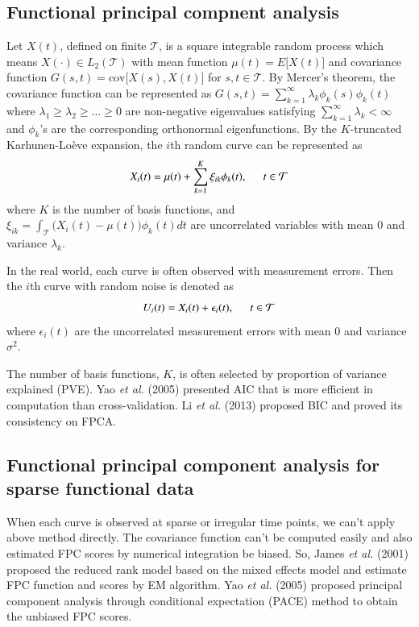 \documentclass[eng]{csam}
\begin{document}
\subsection{Functional principal compnent analysis}
Let $X(t)$, defined on finite $\mathcal{T}$, is a square integrable random process which means $X(\cdot) \in L_2(\mathcal{T})$ with mean function $\mu(t) = E\big[X(t)\big]$ and covariance function $G(s,t) = \text{cov}\big[X(s),X(t)\big]$ for $s, t \in \mathcal{T}$. By Mercer's theorem, the covariance function can be represented as $G(s,t) = \sum_{k=1}^\infty \lambda_k \phi_k(s) \phi_k(t)$ where $\lambda_1 \ge \lambda_2 \ge \dots \ge 0 $ are non-negative eigenvalues satisfying $\sum_{k=1}^\infty \lambda_k < \infty$ and $\phi_k$'s are the corresponding orthonormal eigenfunctions. By the $K$-truncated Karhunen-Lo\`{e}ve expansion, the $i$th random curve can be represented as
\begin{equation*}
	X_i(t) = \mu(t) + \sum_{k=1}^K \xi_{ik} \phi_k(t), \hspace{0.5cm} t \in \mathcal{T}
\end{equation*}
where $K$ is the number of basis functions, and $\xi_{ik} = \int_{\mathcal{T}} \big( X_i(t) - \mu(t) \big)\phi_k(t) dt $ are uncorrelated variables with mean 0 and variance $\lambda_k$.

In the real world, each curve is often observed with measurement errors. Then the $i$th curve with random noise is denoted as
\begin{equation*}
	U_i(t) = X_i(t) + \epsilon_i(t), \hspace{0.5cm} t \in \mathcal{T}
\end{equation*}
where $\epsilon_i(t)$ are the uncorrelated measurement errors with mean 0 and variance $\sigma^2$.

The number of basis functions, $K$, is often selected by proportion of variance explained (PVE). Yao {\em et al.} (2005) presented AIC that is more efficient in computation than cross-validation. Li {\em et al.} (2013) proposed BIC and proved its consistency on FPCA.



\subsection{Functional principal component analysis for sparse functional data}
When each curve is observed at sparse or irregular time points, we can't apply above method directly. The covariance function can't be computed easily and also estimated FPC scores by numerical integration be biased. So, James {\em et al.} (2001) proposed the reduced rank model based on the mixed effects model and estimate FPC function and scores by EM algorithm. Yao {\em et al.} (2005) proposed principal component analysis through conditional expectation (PACE) method to obtain the unbiased FPC scores.
\end{document}
